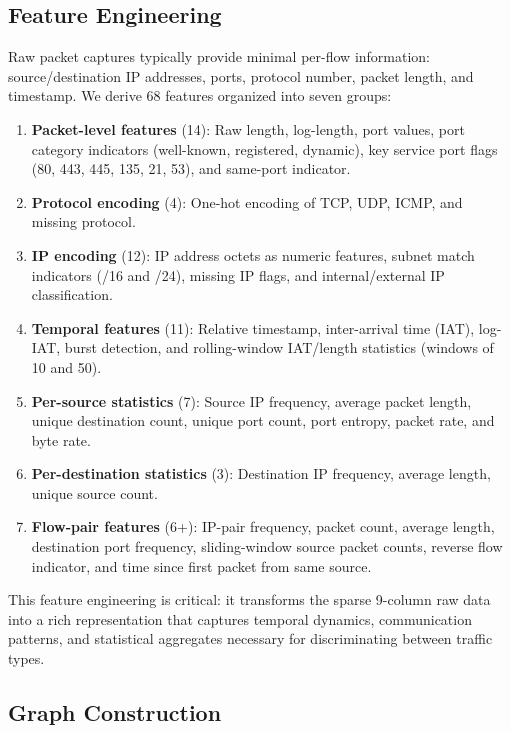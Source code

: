 \documentclass[conference]{IEEEtran}
\begin{document}
\subsection{Feature Engineering}

Raw packet captures typically provide minimal per-flow information: source/destination IP addresses, ports, protocol number, packet length, and timestamp. We derive 68 features organized into seven groups:

\begin{enumerate}
    \item \textbf{Packet-level features} (14): Raw length, log-length, port values, port category indicators (well-known, registered, dynamic), key service port flags (80, 443, 445, 135, 21, 53), and same-port indicator.
    \item \textbf{Protocol encoding} (4): One-hot encoding of TCP, UDP, ICMP, and missing protocol.
    \item \textbf{IP encoding} (12): IP address octets as numeric features, subnet match indicators (/16 and /24), missing IP flags, and internal/external IP classification.
    \item \textbf{Temporal features} (11): Relative timestamp, inter-arrival time (IAT), log-IAT, burst detection, and rolling-window IAT/length statistics (windows of 10 and 50).
    \item \textbf{Per-source statistics} (7): Source IP frequency, average packet length, unique destination count, unique port count, port entropy, packet rate, and byte rate.
    \item \textbf{Per-destination statistics} (3): Destination IP frequency, average length, unique source count.
    \item \textbf{Flow-pair features} (6+): IP-pair frequency, packet count, average length, destination port frequency, sliding-window source packet counts, reverse flow indicator, and time since first packet from same source.
\end{enumerate}

This feature engineering is critical: it transforms the sparse 9-column raw data into a rich representation that captures temporal dynamics, communication patterns, and statistical aggregates necessary for discriminating between traffic types.

\subsection{Graph Construction}
\end{document}
